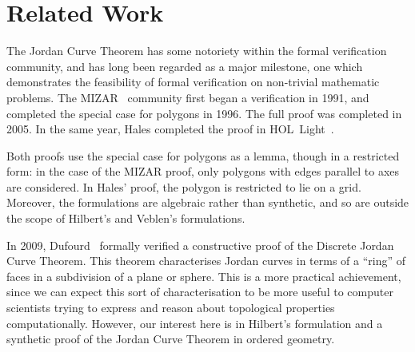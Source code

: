 \section{Related Work}
The Jordan Curve Theorem has some notoriety within the formal verification community, and has long been regarded as a major milestone, one which  demonstrates the feasibility of formal verification on non-trivial mathematic problems. The MIZAR~\cite{MizarMathematicalVernacular} community first began a verification in 1991, and completed the special case for polygons in 1996. The full proof was completed in 2005. In the same year, Hales completed the proof in HOL~Light~\cite{HalesJordanCurve}. 

Both proofs use the special case for polygons as a lemma, though in a restricted form: in the case of the MIZAR proof, only polygons with edges parallel to axes are considered. In Hales' proof, the polygon is restricted to lie on a grid. Moreover, the formulations are algebraic rather than synthetic, and so are outside the scope of Hilbert's and Veblen's formulations.

In 2009, Dufourd~\cite{DufourdJordanCurve} formally verified a constructive proof of the Discrete Jordan Curve Theorem. This theorem characterises Jordan curves in terms of a ``ring'' of faces in a subdivision of a plane or sphere. This is a more practical achievement, since we can expect this sort of characterisation to be more useful to computer scientists trying to express and reason about topological properties computationally. However, our interest here is in Hilbert's formulation and a synthetic proof of the Jordan Curve Theorem in ordered geometry.



